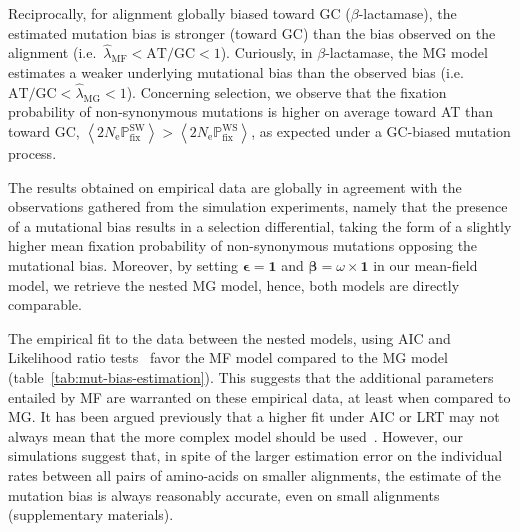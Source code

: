 \documentclass{article}
\newcommand{\UniDimArray}[1]{\bm{#1}}
\newcommand{\Ne}{N_{\text{e}}}
\newcommand{\proba}{\mathbb{P}}
\newcommand{\Pfix}{2 \Ne \proba_{\text{fix}}}
\newcommand{\vecOne}{\UniDimArray{1}}
\newcommand{\atgc}{\text{AT/GC}}
\newcommand{\avgpfixATtoGC}{\left\langle \Pfix^{\text{WS}} \right\rangle }
\newcommand{\avgpfixGCtoAT}{\left\langle \Pfix^{\text{SW}} \right\rangle }
\newcommand{\AAexchan}{\beta}
\newcommand{\AAExchan}{\UniDimArray{\AAexchan}}
\newcommand{\AAequi}{\epsilon}
\newcommand{\AAEqui}{\UniDimArray{\AAequi}}
\begin{document}
Reciprocally, for alignment globally biased toward GC ($\beta$-lactamase), the estimated mutation bias is stronger (toward GC) than the bias observed on the alignment (i.e.~$\widehat{\lambda}_{\text{{MF}}} < \atgc < 1$).
Curiously, in $\beta$-lactamase, the {MG} model estimates a weaker underlying mutational bias than the observed bias (i.e.~$ \atgc < \widehat{\lambda}_{\text{{MG}}} < 1$).
Concerning selection, we observe that the fixation probability of {non-synonymous} mutations is higher on average toward AT than toward GC, $\avgpfixGCtoAT > \avgpfixATtoGC$, as expected under a GC-biased mutation process.

The results obtained on empirical data are globally in agreement with the observations gathered from the simulation experiments, namely that the presence of a mutational bias results in a selection differential, taking the form of a slightly higher mean fixation probability of {non-synonymous} mutations opposing the mutational bias.
Moreover, by setting $\AAEqui = \vecOne$ and $\AAExchan = \omega \times \vecOne$ in our mean-field model, we retrieve the nested MG model, hence, both models are directly comparable.

The empirical fit to the data between the nested models, using AIC and Likelihood ratio tests~\citep{Posada2004} favor the MF model compared to the MG model (table~\ref{tab:mut-bias-estimation}).
This suggests that the additional parameters entailed by MF are warranted on these empirical data, at least when compared to MG.
It has been argued previously that a higher fit under AIC or LRT may not always mean that the more complex model should be used~\citep{Delport2010}.
However, our simulations suggest that, in spite of the larger estimation error on the individual rates between all pairs of amino-acids on smaller alignments, the estimate of the mutation bias is always reasonably accurate, even on small alignments (supplementary materials).
\end{document}
